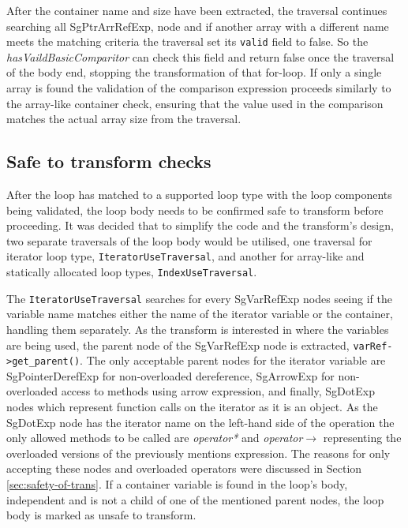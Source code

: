 \documentclass[bsc,frontabs,singlespacing,twoside,parskip,deptreport]{infthesis}
\begin{document}
After the container name and size have been extracted, the traversal continues searching all SgPtrArrRefExp, node and if another array with a different name meets the matching criteria the traversal set its \texttt{valid} field to false. So the \textit{hasVaildBasicComparitor} can check this field and return false once the traversal of the body end, stopping the transformation of that for-loop. If only a single array is found the validation of the comparison expression proceeds similarly to the array-like container check, ensuring that the value used in the comparison matches the actual array size from the traversal.  

\subsection{Safe to transform checks}

After the loop has matched to a supported loop type with the loop components being validated, the loop body needs to be confirmed safe to transform before proceeding. It was decided that to simplify the code and the transform's design, two separate traversals of the loop body would be utilised, one traversal for iterator loop type, \texttt{IteratorUseTraversal}, and another for array-like and statically allocated loop types, \texttt{IndexUseTraversal}. 

The \texttt{IteratorUseTraversal} searches for every SgVarRefExp nodes seeing if the variable name matches either the name of the iterator variable or the container, handling them separately. As the transform is interested in where the variables are being used, the parent node of the SgVarRefExp node is extracted, \texttt{varRef->get\_parent()}. The only acceptable parent nodes for the iterator variable are SgPointerDerefExp for non-overloaded dereference, SgArrowExp for non-overloaded access to methods using arrow expression, and finally, SgDotExp nodes which represent function calls on the iterator as it is an object. As the SgDotExp node has the iterator name on the left-hand side of the operation the only allowed methods to be called are \textit{operator*} and \textit{operator$\rightarrow$} representing the overloaded versions of the previously mentions expression. The reasons for only accepting these nodes and overloaded operators were discussed in Section \ref{sec:safety-of-trans}. If a container variable is found in the loop's body, independent and is not a child of one of the mentioned parent nodes, the loop body is marked as unsafe to transform.
\end{document}
